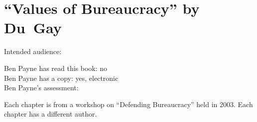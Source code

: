 \section{``Values of Bureaucracy'' by Du~Gay\label{review:dugay_values}}

\cite{2005_DuGay}

Intended audience:

Ben Payne has read this book: no\\
Ben Payne has a copy: yes, electronic\\
Ben Payne's assessment:


Each chapter is from a workshop on ``Defending
Bureaucracy'' held in 2003. Each chapter has a different author. 
